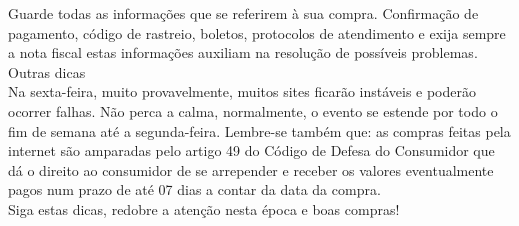 \documentclass[]{article}
\begin{document}
Guarde todas as informações que se referirem à sua compra. Confirmação de pagamento, código de rastreio, boletos, protocolos de atendimento e exija sempre a nota fiscal estas informações auxiliam na resolução de possíveis problemas.\\
\newline
Outras dicas\\
\newline
Na sexta-feira, muito provavelmente, muitos sites ficarão instáveis e poderão ocorrer  falhas. Não perca a calma, normalmente, o evento se estende por todo o fim de semana até a segunda-feira.
Lembre-se também que: as compras feitas pela internet são amparadas pelo artigo 49 do Código de Defesa do Consumidor que dá o direito ao consumidor de se arrepender e receber os valores eventualmente pagos num prazo de até 07 dias a contar da data da compra.\\
\newline
Siga estas dicas, redobre a atenção nesta época e boas compras!\\
\newline
\end{document}
